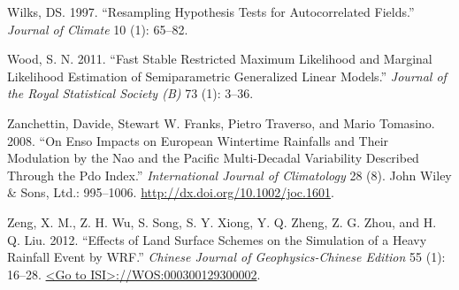 \documentclass[]{elsarticle} %
\theoremstyle{definition}
\theoremstyle{definition}
\theoremstyle{definition}
\theoremstyle{remark}
\begin{document}
\hypertarget{ref-Wilks1997}{}
Wilks, DS. 1997. ``Resampling Hypothesis Tests for Autocorrelated
Fields.'' \emph{Journal of Climate} 10 (1): 65--82.

\hypertarget{ref-Wood2011}{}
Wood, S. N. 2011. ``Fast Stable Restricted Maximum Likelihood and
Marginal Likelihood Estimation of Semiparametric Generalized Linear
Models.'' \emph{Journal of the Royal Statistical Society (B)} 73 (1):
3--36.

\hypertarget{ref-Zanchettin2008}{}
Zanchettin, Davide, Stewart W. Franks, Pietro Traverso, and Mario
Tomasino. 2008. ``On Enso Impacts on European Wintertime Rainfalls and
Their Modulation by the Nao and the Pacific Multi-Decadal Variability
Described Through the Pdo Index.'' \emph{International Journal of
Climatology} 28 (8). John Wiley \& Sons, Ltd.: 995--1006.
\url{http://dx.doi.org/10.1002/joc.1601}.

\hypertarget{ref-Zeng2012}{}
Zeng, X. M., Z. H. Wu, S. Song, S. Y. Xiong, Y. Q. Zheng, Z. G. Zhou,
and H. Q. Liu. 2012. ``Effects of Land Surface Schemes on the Simulation
of a Heavy Rainfall Event by WRF.'' \emph{Chinese Journal of
Geophysics-Chinese Edition} 55 (1): 16--28.
\href{\%3CGo\%20to\%20ISI\%3E://WOS:000300129300002}{\textless{}Go to ISI\textgreater{}://WOS:000300129300002}.
\end{document}
